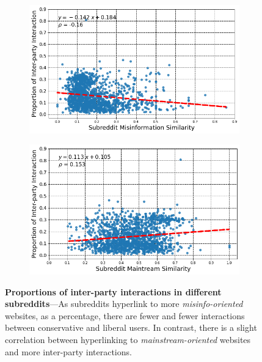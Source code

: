 \begin{figure}
\begin{subfigure}{.49\textwidth}
  \centering
\includegraphics[width=1\linewidth]{figures/subreddit_interparty_interaction.png}

  \label{fig:pagerank-sub2}
\end{subfigure}
\begin{subfigure}{.49\textwidth}
  \centering
\includegraphics[width=1\linewidth]{figures/subreddit_mainstream_interaction.png}

  \label{fig:pagerank-sub2}
\end{subfigure}
\caption{\textbf{Proportions of inter-party interactions in different subreddits}---As subreddits hyperlink to more \textit{misinfo-oriented} websites, as a percentage, there are fewer and fewer interactions between conservative and liberal users. In contrast, there is a slight correlation between hyperlinking to \textit{mainstream-oriented} websites and more inter-party interactions. }
\label{fig:subreddit-misinformation-mainstream-similarity-interaction}
\end{figure}




